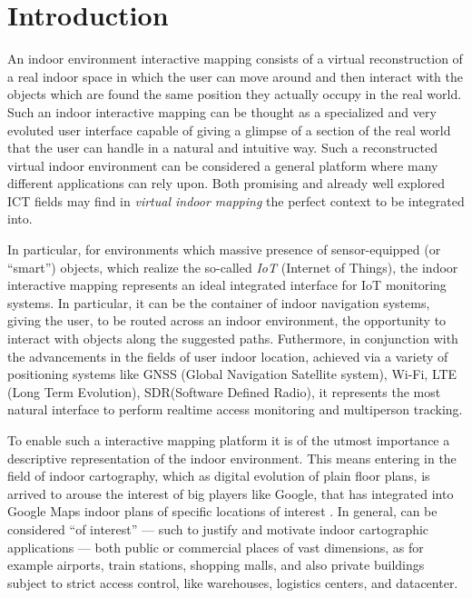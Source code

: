 \section{Introduction}\label{introduction}

An indoor environment interactive mapping consists of a virtual reconstruction
of a real indoor space in which the user can move around and then interact
with the objects which are found the same position they actually occupy in the
real world. Such an indoor interactive mapping can be thought as a specialized
and very evoluted user interface capable of giving a glimpse of a section of
the real world that the user can handle in a natural and intuitive way.  Such
a reconstructed virtual indoor environment can be considered a general
platform where many different applications can rely upon. Both promising and
already well explored ICT fields may find in \emph{virtual indoor mapping} the
perfect context to be integrated into.

In particular, for environments which massive presence of sensor-equipped (or
``smart'') objects, which realize the so-called \emph{IoT} (Internet of
Things), the indoor interactive mapping represents an ideal integrated
interface for IoT monitoring systems. In particular, it can be the container
of indoor navigation systems, giving the user, to be routed across an indoor
environment, the opportunity to interact with objects along the suggested
paths. Futhermore, in conjunction with the advancements in the fields of user
indoor location, achieved via a variety of positioning systems like GNSS
(Global Navigation Satellite system), Wi-Fi, LTE (Long Term Evolution),
SDR(Software Defined Radio), it represents the most natural interface to
perform realtime access monitoring and multiperson tracking.

To enable such a interactive mapping platform it is of the utmost importance a
descriptive representation of the indoor environment. This means entering in
the field of indoor cartography, which as digital evolution of plain floor
plans, is arrived to arouse the interest of big players like Google, that has
integrated into Google Maps indoor plans of specific locations of interest
\cite{indoormaps}. In general, can be considered ``of interest'' --- such to
justify and motivate indoor cartographic applications --- both public or
commercial places of vast dimensions, as for example airports, train stations,
shopping malls, and also private buildings subject to strict access control,
like warehouses, logistics centers, and datacenter.

